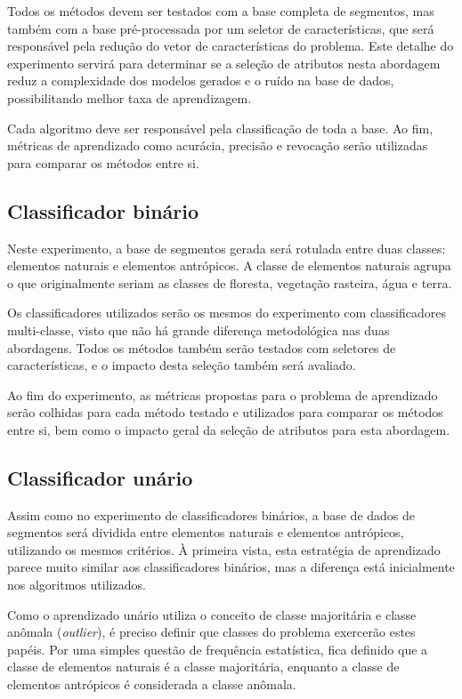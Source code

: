 Todos os métodos devem ser testados com a base completa de segmentos, mas também com a base pré-processada por um seletor de características, que será responsável pela redução do vetor de características do problema. Este detalhe do experimento servirá para determinar se a seleção de atributos nesta abordagem reduz a complexidade dos modelos gerados e o ruído na base de dados, possibilitando melhor taxa de aprendizagem.

Cada algoritmo deve ser responsável pela classificação de toda a base. Ao fim, métricas de aprendizado como acurácia, precisão e revocação serão utilizadas para comparar os métodos entre si.

\subsection{Classificador binário}

Neste experimento, a base de segmentos gerada será rotulada entre duas classes: elementos naturais e elementos antrópicos. A classe de elementos naturais agrupa o que originalmente seriam as classes de floresta, vegetação rasteira, água e terra.

Os classificadores utilizados serão os mesmos do experimento com classificadores multi-classe, visto que não há grande diferença metodológica nas duas abordagens. Todos os métodos também serão testados com seletores de características, e o impacto desta seleção também será avaliado.

Ao fim do experimento, as métricas propostas para o problema de aprendizado serão colhidas para cada método testado e utilizados para comparar os métodos entre si, bem como o impacto geral da seleção de atributos para esta abordagem.

\subsection{Classificador unário}

Assim como no experimento de classificadores binários, a base de dados de segmentos será dividida entre elementos naturais e elementos antrópicos, utilizando os mesmos critérios. À primeira vista, esta estratégia de aprendizado parece muito similar aos classificadores binários, mas a diferença está inicialmente nos algoritmos utilizados.

Como o aprendizado unário utiliza o conceito de classe majoritária e classe anômala (\textit{outlier}), é preciso definir que classes do problema exercerão estes papéis. Por uma simples questão de frequência estatística, fica definido que a classe de elementos naturais é a classe majoritária, enquanto a classe de elementos antrópicos é considerada a classe anômala.

